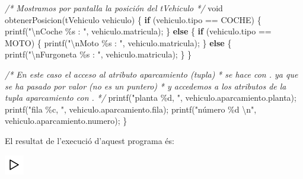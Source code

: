 \documentclass[
]{book}
\newenvironment{Shaded}{\begin{snugshade}}{\end{snugshade}}
\newcommand{\CommentTok}[1]{\textcolor[rgb]{0.56,0.35,0.01}{\textit{#1}}}
\newcommand{\ControlFlowTok}[1]{\textcolor[rgb]{0.13,0.29,0.53}{\textbf{#1}}}
\newcommand{\DataTypeTok}[1]{\textcolor[rgb]{0.13,0.29,0.53}{#1}}
\newcommand{\NormalTok}[1]{#1}
\newcommand{\SpecialCharTok}[1]{\textcolor[rgb]{0.00,0.00,0.00}{#1}}
\newcommand{\StringTok}[1]{\textcolor[rgb]{0.31,0.60,0.02}{#1}}
\begin{document}
\begin{Shaded}
\begin{Highlighting}[]
\CommentTok{/* Mostramos por pantalla la posición del tVehiculo */}
\DataTypeTok{void}\NormalTok{ obtenerPosicion(tVehiculo vehiculo) \{}
    \ControlFlowTok{if}\NormalTok{ (vehiculo.tipo == COCHE) \{}
\NormalTok{        printf(}\StringTok{"}\SpecialCharTok{\textbackslash{}n}\StringTok{Coche \%s : "}\NormalTok{, vehiculo.matricula);}
\NormalTok{    \} }\ControlFlowTok{else}\NormalTok{ \{}
        \ControlFlowTok{if}\NormalTok{ (vehiculo.tipo == MOTO) \{}
\NormalTok{            printf(}\StringTok{"}\SpecialCharTok{\textbackslash{}n}\StringTok{Moto \%s : "}\NormalTok{, vehiculo.matricula);}
\NormalTok{        \} }\ControlFlowTok{else}\NormalTok{ \{}
\NormalTok{            printf(}\StringTok{"}\SpecialCharTok{\textbackslash{}n}\StringTok{Furgoneta \%s : "}\NormalTok{, vehiculo.matricula);}
\NormalTok{        \}}
\NormalTok{    \}}
    
    \CommentTok{/* En este caso el acceso al atributo aparcamiento (tupla)}
\CommentTok{     * se hace con \textquotesingle{}.\textquotesingle{} ya que se ha pasado por valor (no es un puntero)}
\CommentTok{     * y accedemos a los atributos de la tupla aparcamiento con \textquotesingle{}.\textquotesingle{}}
\CommentTok{     */}
\NormalTok{    printf(}\StringTok{"planta \%d, "}\NormalTok{, vehiculo.aparcamiento.planta);}
\NormalTok{    printf(}\StringTok{"fila \%c, "}\NormalTok{, vehiculo.aparcamiento.fila);}
\NormalTok{    printf(}\StringTok{"número \%d }\SpecialCharTok{\textbackslash{}n}\StringTok{"}\NormalTok{, vehiculo.aparcamiento.numero);}
\NormalTok{\}}
\end{Highlighting}
\end{Shaded}

El resultat de l'execució d'aquest programa és:

\includegraphics{./img/play.png}
\end{document}
